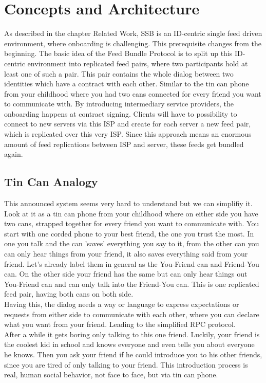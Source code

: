 \chapter{Concepts and Architecture}
As described in the chapter Related Work, SSB is an ID-centric single feed driven environment, where onboarding is challenging. 
This prerequisite changes from the beginning. The basic idea of the Feed Bundle Protocol is to split up this ID-centric environment into replicated feed pairs, where two participants hold at least one of such a pair.  This pair contains the whole dialog between two identities which have a contract with each other. Similar to the tin can phone from your childhood where you had two cans connected for every friend you want to communicate with. By introducing intermediary service providers, the onboarding happens at contract signing. Clients will have to possibility to connect to new servers via this ISP and create for each server a new feed pair, which is replicated over this very ISP. Since this approach means an enormous amount of feed replications between ISP and server, these feeds get bundled again.

\section{Tin Can Analogy}
This announced system seems very hard to understand but we can simplifiy it. Look at it as a tin can phone from your childhood where on either side you have two cans, strapped together for every friend you want to communicate with. You start with one corded phone to your best friend, the one you trust the most. In one you talk and the can 'saves' everything you say to it, from the other can you can only hear things from your friend, it also saves everything said from your friend. Let's already label them in general as the You-Friend can and Friend-You can. On the other side your friend has the same but can only hear things out You-Friend can and can only talk into the Friend-You can. This is one replicated feed pair, having both cans on both side.\\

Having this, the dialog needs a way or language to express expectations or requests from either side to communicate with each other, where you can declare what you want from your friend. Leading to the simplified RPC protocol.\\

After a while it gets boring only talking to this one friend. Luckily, your friend is the coolest kid in school and knows everyone and even tells you about everyone he knows. Then you ask your friend if he could introduce you to his other friends, since you are tired of only talking to your friend. This introduction process is real, human social behavior, not face to face, but via tin can phone.\\


